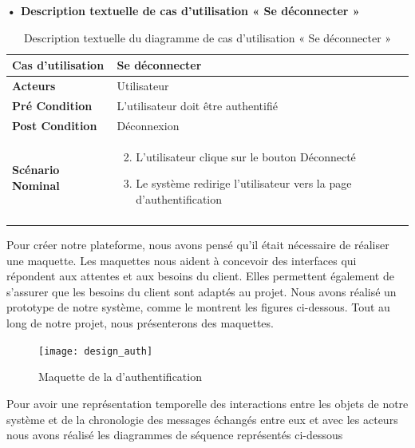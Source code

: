\textbf{•	Description textuelle de cas d'utilisation « Se déconnecter »}

\begin{longtable}{|p{5cm}|p{10cm}|}
\hline
\textbf{Cas d'utilisation}&Se déconnecter\\
\hline
\textbf{Acteurs}&Utilisateur \\
\hline
\textbf{Pré Condition}&L'utilisateur doit être authentifié\\
\hline
\textbf{Post Condition}&Déconnexion\\
\hline
\textbf{Scénario Nominal}&
\vspace{-\baselineskip}
\begin{enumerate}
    \setcounter{enumi}{1}
    \item L'utilisateur clique sur le bouton Déconnecté
    \item Le système redirige l'utilisateur vers la page d'authentification

\end{enumerate}\\
\hline
\caption{Description textuelle du diagramme de cas d'utilisation « Se déconnecter »}
\label{tab:use_case_logout}
\end{longtable}

Pour créer notre plateforme, nous avons pensé qu'il était nécessaire de réaliser une maquette. Les maquettes nous aident à concevoir des interfaces qui répondent aux attentes et aux besoins du client. Elles permettent également de s'assurer que les besoins du client sont adaptés au projet. Nous avons réalisé un prototype de notre système, comme le montrent les figures ci-dessous. Tout au long de notre projet, nous présenterons des maquettes.

\begin{figure}[H]
  \centering
  \texttt{[image: design\_auth]}
  \caption{Maquette de la d'authentification}
  \label{fig:design_auth}
\end{figure}


Pour avoir une représentation temporelle des interactions entre les objets de notre système et de la chronologie des messages échangés entre eux et avec les acteurs nous avons réalisé les diagrammes de séquence représentés ci-dessous

